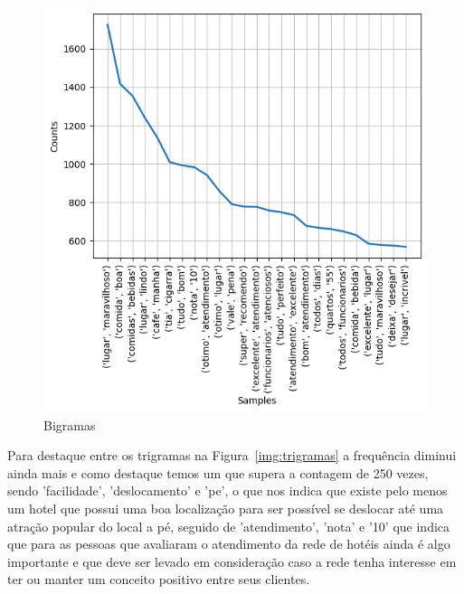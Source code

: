 \begin{figure}[!h]
	\centering
	\includegraphics[width=.8\textwidth]{figs/exploratoria/bigramas.png}
	\caption{Bigramas}
	\label{img:bigramas}
\end{figure}

Para destaque entre os trigramas na Figura~\ref{img:trigramas} a frequência diminui ainda mais e como destaque temos um que supera a contagem de 250 vezes, sendo 'facilidade', 'deslocamento' e 'pe', o que nos indica que existe pelo menos um hotel que possui uma boa localização para ser possível se deslocar até uma atração popular do local a pé, seguido de 'atendimento', 'nota' e '10' que indica que para as pessoas que avaliaram o atendimento da rede de hotéis ainda é algo importante e que deve ser levado em consideração caso a rede tenha interesse em ter ou manter um conceito positivo entre seus clientes.

